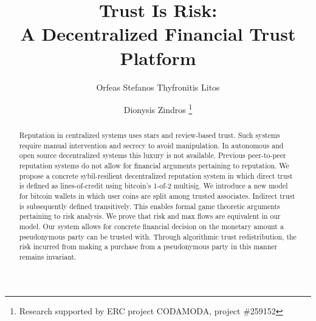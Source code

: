 \documentclass[11pt]{llncs}
\begin{document}
\title{Trust Is Risk: \\ A Decentralized Financial Trust Platform}
\author{Orfeas Stefanos Thyfronitis Litos \and Dionysis Zindros\fnmsep
                                                       \thanks{Research supported by ERC project CODAMODA, project \#259152}}
\maketitle

  \begin{abstract}
     Reputation in centralized systems uses stars and review-based trust. Such systems require manual intervention and
     secrecy to avoid manipulation. In autonomous and open source decentralized systems this luxury is not available.
     Previous peer-to-peer reputation systems do not allow for financial arguments pertaining to reputation. We propose a
     concrete sybil-resilient decentralized reputation system in which direct trust is defined as lines-of-credit using
     bitcoin's 1-of-2 multisig. We introduce a new model for bitcoin wallets in which user coins are split among trusted
     associates. Indirect trust is subsequently defined transitively. This enables formal game theoretic arguments pertaining
     to risk analysis. We prove that risk and max flows are equivalent in our model. Our system allows for concrete financial
     decision on the monetary amount a pseudonymous party can be trusted with. Through algorithmic trust redistribution, the
     risk incurred from making a purchase from a pseudonymous party in this manner remains invariant.
  \end{abstract}
\end{document}
